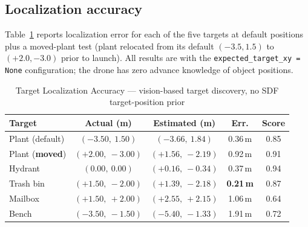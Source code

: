 \documentclass[conference]{IEEEtran}
\begin{document}
\subsection{Localization accuracy}

Table~\ref{tab:loc_acc} reports localization error for each of
the five targets at default positions plus a moved-plant test
(plant relocated from its default $(-3.5, 1.5)$ to $(+2.0, -3.0)$
prior to launch). All results are with the
\texttt{expected\_target\_xy = None} configuration; the drone has
zero advance knowledge of object positions.

\begin{table}[!t]
\caption{Target Localization Accuracy --- vision-based target discovery, no SDF target-position prior}
\label{tab:loc_acc}
\centering
\begin{tabular}{lcccc}
\hline
\textbf{Target} & \textbf{Actual (m)} & \textbf{Estimated (m)} & \textbf{Err.} & \textbf{Score} \\
\hline
Plant (default)  & $(-3.50,\ 1.50)$  & $(-3.66,\ 1.84)$  & 0.36\,m  & 0.85 \\
Plant (\textbf{moved}) & $(+2.00,\ -3.00)$ & $(+1.56,\ -2.19)$ & 0.92\,m  & 0.91 \\
Hydrant          & $(0.00,\ 0.00)$   & $(+0.16,\ -0.34)$ & 0.37\,m  & 0.94 \\
Trash bin        & $(+1.50,\ -2.00)$ & $(+1.39,\ -2.18)$ & \textbf{0.21\,m}  & 0.87 \\
Mailbox          & $(+1.50,\ +2.00)$ & $(+2.55,\ +2.15)$ & 1.06\,m  & 0.64 \\
Bench            & $(-3.50,\ -1.50)$ & $(-5.40,\ -1.33)$ & 1.91\,m  & 0.72 \\
\hline
\end{tabular}
\end{table}
\end{document}
